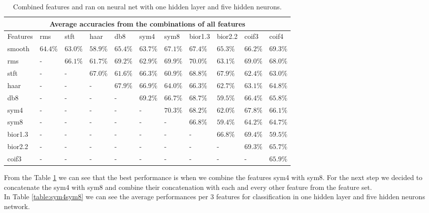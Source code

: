 \begin{table}
\renewcommand{\arraystretch}{1.2}
\begin{tabular}{ |p{1.3cm}||p{1cm}|p{1cm}|p{1cm}|p{1cm}|p{1cm}|p{1cm}|p{1.1cm}|p{1.1cm}|p{1cm}|p{1cm}|  }
 \hline
 \multicolumn{11}{|c|}{Average accuracies from the combinations of all features} \\
 \hline
 Features  & rms & stft & haar & db8 & sym4 & sym8 & bior1.3 & bior2.2 & coif3 & coif4\\
 \hline
 smooth   & $64.4\%$ &$63.0\%$ &$58.9\%$ &$65.4\%$ &$63.7\%$ &$67.1\%$ &$67.4\%$ &$65.3\%$ &$66.2\%$ &$69.3\%$ \\
 rms & - &$66.1\%$ &$61.7\%$ &$69.2\%$ &$62.9\%$ &\cellcolor{blue!35}$69.9\%$ &\cellcolor{blue!35}$70.0\%$ &$63.1\%$ &$69.0\%$ &$68.0\%$\\
 stft & - & - & $67.0\%$ &$61.6\%$ &$66.3\%$ &$60.9\%$ &$68.8\%$ &$67.9\%$ &$62.4\%$ &$63.0\%$\\
 haar & - & - & - & $67.9\%$ &$66.9\%$ &$64.0\%$ &$66.3\%$ &$62.7\%$ &$63.1\%$ &$64.8\%$\\
 db8 & - & - & - & - &$69.2\%$ &$66.7\%$ &$68.7\%$ &$59.5\%$ &$66.4\%$ &$65.8\%$\\
 sym4 & - & - & - & - & - &\cellcolor{blue!35}$70.3\%$ &$68.2\%$ &$62.0\%$ &$67.8\%$ &$66.1\%$\\
 sym8 & - & - & - & - & - & - &$66.8\%$ &$59.4\%$ &$64.2\%$ &$64.7\%$\\
 bior1.3 & - & - & - & - & - & - & - &$66.8\%$ &$69.4\%$ &$59.5\%$\\
 bior2.2 & - & - & - & - & - & - & - & - &$69.3\%$ &$65.7\%$\\
 coif3 & - & - & - & - & - & - & - & - & - &$65.9\%$\\
 \hline
\end{tabular}
\caption{Combined features and ran on neural net with one hidden layer and five hidden neurons.}
\label{table:perf_features_duet}
\end{table}
From the Table \ref{table:perf_features_duet} we can see that the best performance is when we combine the features sym4 with sym8. For the next step we decided to concatenate the sym4 with sym8 and combine their concatenation with each and every other feature from the feature set.  \\
In Table \ref{table:sym4sym8} we can see the average performances per 3 features for classification in one hidden layer and five hidden neurons network.

